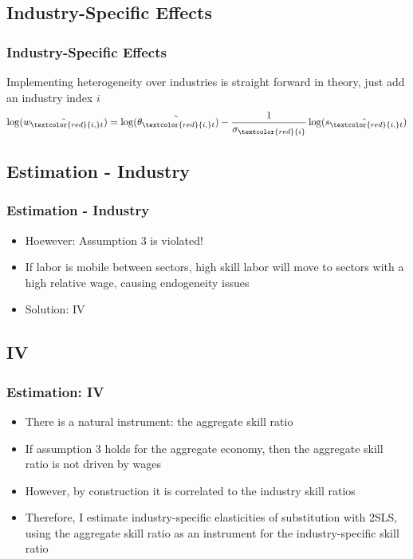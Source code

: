 \documentclass[11pt]{beamer} \usetheme{Frankfurt}
\begin{document}
\subsection{Industry-Specific Effects}
\begin{frame}
  \frametitle{Industry-Specific Effects}
  Implementing heterogeneity over industries is straight forward in
  theory, just add an industry index $i$
  \begin{equation}
    \label{eq:12}
    \log(\tilde{w_{\textcolor{red}{i,}t}}) = \log(\tilde{\theta_{\textcolor{red}{i,}t}}) - \frac{1}{\sigma_{\textcolor{red}{i}}}\log(\tilde{s_{\textcolor{red}{i,}t}})
  \end{equation}
\end{frame}
\subsection{Estimation - Industry}
\begin{frame}
  \frametitle{Estimation - Industry}
  \begin{itemize}
  \item Hoewever: Assumption 3 is violated!
  \item If labor is mobile between sectors, high skill labor will move
    to sectors with a high relative wage, causing endogeneity issues

  \item Solution: IV
  \end{itemize}

\end{frame}
\subsection{IV}
\begin{frame}
  \frametitle{Estimation: IV}
  \begin{itemize}
  \item There is a natural instrument: the aggregate skill ratio
  \item If assumption 3 holds for the aggregate economy, then the
    aggregate skill ratio is not driven by wages
  \item However, by construction it is correlated to the industry
    skill ratios
  \item Therefore, I estimate industry-specific elasticities of
    substitution with 2SLS, using the aggregate skill ratio as an
    instrument for the industry-specific skill ratio
  \end{itemize}
\end{frame}
\end{document}

